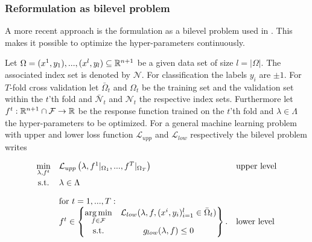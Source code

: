 \subsubsection{Reformulation as bilevel problem}

A more recent approach is the formulation as a bilevel problem used in \cite{Kunapuli2008, Moore2011}.
This makes it possible to optimize the hyper-parameters continuously.


Let \(\Omega = {(x^1,y_1),...,(x^l,y_l)} \subseteq \mathbb{R}^{n+1}\) be a given data set of size \(l = |\Omega|\). The associated index set is denoted by \(\mathcal{N}\). For classification the labels \(y_i\) are \(\pm1\).
For \(T\)-fold cross validation let \(\bar{\Omega}_t\) and \(\Omega_t\) be the training set and the validation set within the \(t\)'th fold and \(\bar{\mathcal{N}}_t\) and \(\mathcal{N}_t\) the respective index sets.
Furthermore let \(f^t:\mathbb{R}^{n+1}\cap\mathcal{F} \to \mathbb{R}\) be the response function trained on the \(t\)'th fold and \(\lambda \in \Lambda\) the hyper-parameters to be optimized.
For a general machine learning problem with upper and lower loss function \(\mathcal{L}_{upp}\) and \(\mathcal{L}_{low}\) respectively the bilevel problem writes
 

\begin{equation}
	\begin{array}{cll}
	\displaystyle\min_{\lambda, f^t} & \mathcal{L}_{upp}\left(\lambda,f^1|_{\Omega_1},...,f^T|_{\Omega_T}\right) & \text{upper level} \vspace{0.5ex}\\
	\text{s.t.} & \lambda \in \Lambda & \vspace{1em}\\
	& \text{for } t = 1,...,T: & \\
	& f^t \in \begin{Bmatrix} \displaystyle\argmin_{f\in \mathcal{F}} & \mathcal{L}_{low}(\lambda,f,(x^i,y_i)_{i = 1}^l\in \bar{\Omega}_t) \vspace{0.5ex}\\
	                        \text{s.t.} & g_{low}(\lambda,f) \leq 0 
													\end{Bmatrix}. & \text{lower level}
	\end{array}
\end{equation}


